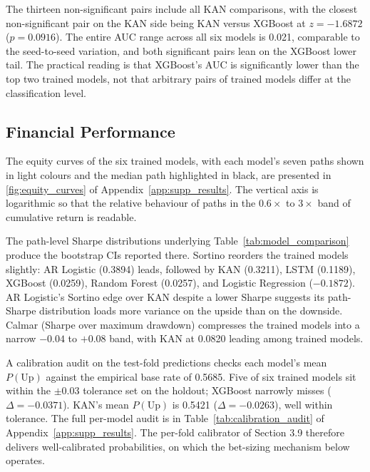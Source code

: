 The thirteen non-significant pairs include all KAN comparisons, with the closest non-significant pair on the KAN side being KAN versus XGBoost at $z = -1.6872$ ($p = 0.0916$). The entire AUC range across all six models is 0.021, comparable to the seed-to-seed variation, and both significant pairs lean on the XGBoost lower tail. The practical reading is that XGBoost's AUC is significantly lower than the top two trained models, not that arbitrary pairs of trained models differ at the classification level.


\subsection{Financial Performance}\label{subsec:results_financial}

The equity curves of the six trained models, with each model's seven paths shown in light colours and the median path highlighted in black, are presented in \label{ref:equity_curves_call}\autoref{fig:equity_curves} of Appendix~\ref{app:supp_results}. The vertical axis is logarithmic so that the relative behaviour of paths in the $0.6\times$ to $3\times$ band of cumulative return is readable.

The path-level Sharpe distributions underlying Table~\ref{tab:model_comparison} produce the bootstrap CIs reported there. Sortino reorders the trained models slightly: AR Logistic (0.3894) leads, followed by KAN (0.3211), LSTM (0.1189), XGBoost (0.0259), Random Forest (0.0257), and Logistic Regression ($-0.1872$). AR Logistic's Sortino edge over KAN despite a lower Sharpe suggests its path-Sharpe distribution loads more variance on the upside than on the downside. Calmar (Sharpe over maximum drawdown) compresses the trained models into a narrow $-0.04$ to $+0.08$ band, with KAN at 0.0820 leading among trained models.

A calibration audit on the test-fold predictions checks each model's mean $P(\text{Up})$ against the empirical base rate of 0.5685. Five of six trained models sit within the $\pm 0.03$ tolerance set on the holdout; XGBoost narrowly misses ($\Delta = -0.0371$). KAN's mean $P(\text{Up})$ is 0.5421 ($\Delta = -0.0263$), well within tolerance. The full per-model audit is in \label{ref:calibration_audit_call}Table~\ref{tab:calibration_audit} of Appendix~\ref{app:supp_results}. The per-fold calibrator of Section 3.9 therefore delivers well-calibrated probabilities, on which the bet-sizing mechanism below operates.

